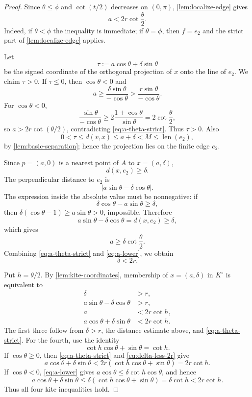 \documentclass[11pt]{article}
\newcommand{\len}{\operatorname{len}}
\numberwithin{equation}{section}
\begin{document}
\begin{proof}
Since $\theta\le\phi$ and $\cot(t/2)$ decreases on $(0,\pi)$, \cref{lem:localize-edge} gives
\begin{equation}\label{eq:a-theta-strict}
a<2r\cot\frac\theta2.
\end{equation}
Indeed, if $\theta<\phi$ the inequality is immediate; if $\theta=\phi$, then $f=e_2$ and the strict part of \cref{lem:localize-edge} applies.

Let
\[
\tau:=a\cos\theta+\delta\sin\theta
\]
be the signed coordinate of the orthogonal projection of $x$ onto the line of $e_2$. We claim $\tau>0$. If $\tau\le0$, then $\cos\theta<0$ and
\[
a\ge\frac{\delta\sin\theta}{-\cos\theta}
>\frac{r\sin\theta}{-\cos\theta}.
\]
For $\cos\theta<0$,
\[
\frac{\sin\theta}{-\cos\theta}
\ge2\frac{1+\cos\theta}{\sin\theta}
=2\cot\frac\theta2,
\]
so $a>2r\cot(\theta/2)$, contradicting \eqref{eq:a-theta-strict}. Thus $\tau>0$. Also
\[
0<\tau\le d(v,x)\le a+\delta<M\le\len(e_2),
\]
by \cref{lem:basic-separation}; hence the projection lies on the finite edge $e_2$.

Since $p=(a,0)$ is a nearest point of $A$ to $x=(a,\delta)$,
\[
d(x,e_2)\ge\delta.
\]
The perpendicular distance to $e_2$ is
\[
|a\sin\theta-\delta\cos\theta|.
\]
The expression inside the absolute value must be nonnegative: if
\[
\delta\cos\theta-a\sin\theta\ge\delta,
\]
then $\delta(\cos\theta-1)\ge a\sin\theta>0$, impossible. Therefore
\[
a\sin\theta-\delta\cos\theta=d(x,e_2)\ge\delta,
\]
which gives
\begin{equation}\label{eq:a-lower}
a\ge\delta\cot\frac\theta2.
\end{equation}
Combining \eqref{eq:a-theta-strict} and \eqref{eq:a-lower}, we obtain
\begin{equation}\label{eq:delta-less-2r}
\delta<2r.
\end{equation}

Put $h=\theta/2$. By \cref{lem:kite-coordinates}, membership of $x=(a,\delta)$ in $K^\circ$ is equivalent to
\begin{align*}
\delta&>r,\\
a\sin\theta-\delta\cos\theta&>r,\\
a&<2r\cot h,\\
a\cos\theta+\delta\sin\theta&<2r\cot h.
\end{align*}
The first three follow from $\delta>r$, the distance estimate above, and \eqref{eq:a-theta-strict}. For the fourth, use the identity
\begin{equation}\label{eq:cot-identity}
\cot h\cos\theta+\sin\theta=\cot h.
\end{equation}
If $\cos\theta\ge0$, then \eqref{eq:a-theta-strict} and \eqref{eq:delta-less-2r} give
\[
a\cos\theta+\delta\sin\theta
<2r(\cot h\cos\theta+\sin\theta)
=2r\cot h.
\]
If $\cos\theta<0$, \eqref{eq:a-lower} gives $a\cos\theta\le\delta\cot h\cos\theta$, and hence
\[
a\cos\theta+\delta\sin\theta
\le\delta(\cot h\cos\theta+\sin\theta)
=\delta\cot h<2r\cot h.
\]
Thus all four kite inequalities hold.
\end{proof}
\end{document}
